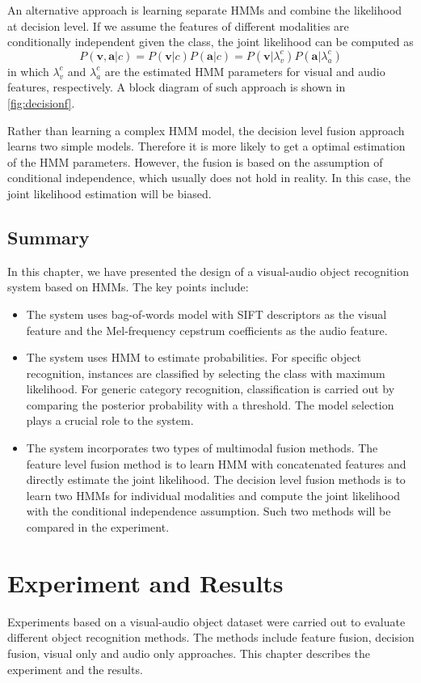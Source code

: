 \documentclass[12pt,final,twoside]{report}
\begin{document}
An alternative approach is learning separate HMMs and combine the likelihood at decision level. If we assume the features of different modalities are conditionally independent given the class, the joint likelihood can be computed as
\begin{equation}
  P(\mathbf{v},\mathbf{a}|c) = P(\mathbf{v}|c) P(\mathbf{a}|c) = P(\mathbf{v}|\lambda_v^c) P(\mathbf{a}|\lambda_a^c)
\end{equation}
in which $\lambda_{v}^c$ and $\lambda_{a}^c$ are the estimated HMM parameters for visual and audio features, respectively. A block diagram of such approach is shown in \cref{fig:decisionf}.

Rather than learning a complex HMM model, the decision level fusion approach learns two simple models. Therefore it is more likely to get a optimal estimation of the HMM parameters. However, the fusion is based on the assumption of conditional independence, which usually does not hold in reality. In this case, the joint likelihood estimation will be biased.

\section{Summary}
In this chapter, we have presented the design of a visual-audio object recognition system based on HMMs. The key points include:
\begin{itemize}
  \item The system uses bag-of-words model with SIFT descriptors as the visual feature and the Mel-frequency cepstrum coefficients as the audio feature.
  \item The system uses HMM to estimate probabilities. For specific object recognition, instances are classified by selecting the class with maximum likelihood. For generic category recognition, classification is carried out by comparing the posterior probability with a threshold. The model selection plays a crucial role to the system.
  \item The system incorporates two types of multimodal fusion methods. The feature level fusion method is to learn HMM with concatenated features and directly estimate the joint likelihood. The decision level fusion methods is to learn two HMMs for individual modalities and compute the joint likelihood with the conditional independence assumption. Such two methods will be compared in the experiment.
\end{itemize}

\cleardoublepage
\chapter{Experiment and Results}
\label{ch:experiment}
Experiments based on a visual-audio object dataset were carried out to evaluate different object recognition methods. The methods include feature fusion, decision fusion, visual only and audio only approaches. This chapter describes the experiment and the results.
\end{document}
